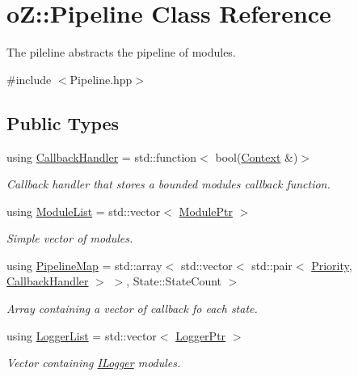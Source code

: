 \hypertarget{classo_z_1_1_pipeline}{}\section{oZ\+::Pipeline Class Reference}
\label{classo_z_1_1_pipeline}


The pileline abstracts the pipeline of modules.  




{\ttfamily \#include $<$Pipeline.\+hpp$>$}

\subsection*{Public Types}
\begin{DoxyCompactItemize}
\item 
using \mbox{\hyperlink{classo_z_1_1_pipeline_a5a71ea2f2d4be5b82589c1b8175722f4}{Callback\+Handler}} = std\+::function$<$ bool(\mbox{\hyperlink{classo_z_1_1_context}{Context}} \&)$>$
\begin{DoxyCompactList}\small\item\em Callback handler that stores a bounded module\textquotesingle{}s callback function. \end{DoxyCompactList}\item 
using \mbox{\hyperlink{classo_z_1_1_pipeline_a3bb478d291a83763b269d8d27e186a47}{Module\+List}} = std\+::vector$<$ \mbox{\hyperlink{namespaceo_z_af5a56aaaee027504979038f38991adcf}{Module\+Ptr}} $>$
\begin{DoxyCompactList}\small\item\em Simple vector of modules. \end{DoxyCompactList}\item 
using \mbox{\hyperlink{classo_z_1_1_pipeline_ae4082276a9a2bafefab47a1298feec67}{Pipeline\+Map}} = std\+::array$<$ std\+::vector$<$ std\+::pair$<$ \mbox{\hyperlink{namespaceo_z_af05a92eb185d18369e9b4acdcd9dcd12}{Priority}}, \mbox{\hyperlink{classo_z_1_1_pipeline_a5a71ea2f2d4be5b82589c1b8175722f4}{Callback\+Handler}} $>$ $>$, State\+::\+State\+Count $>$
\begin{DoxyCompactList}\small\item\em Array containing a vector of callback fo each state. \end{DoxyCompactList}\item 
using \mbox{\hyperlink{classo_z_1_1_pipeline_aa1f26badb603f054e554e3ddf8b846b0}{Logger\+List}} = std\+::vector$<$ \mbox{\hyperlink{namespaceo_z_aaa2fbabbfafc6616a7e69651b62a3d4e}{Logger\+Ptr}} $>$
\begin{DoxyCompactList}\small\item\em Vector containing \mbox{\hyperlink{classo_z_1_1_i_logger}{I\+Logger}} modules. \end{DoxyCompactList}\end{DoxyCompactItemize}
